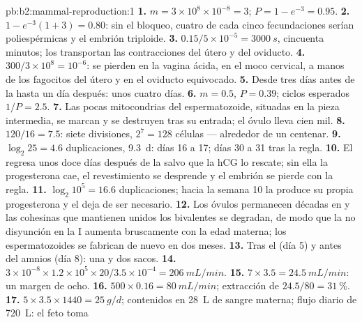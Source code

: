 \begin{solution}{pb:b2:mammal-reproduction:1}
\textbf{1.} $m = 3\times 10^{8}\times 10^{-8} = 3$; $P = 1 - e^{-3} =
0.95$.
\textbf{2.} $1 - e^{-3}(1 + 3) = 0.80$: sin el bloqueo, cuatro de cada
cinco fecundaciones serían poliespérmicas y el embrión triploide.
\textbf{3.} $0.15/5\times 10^{-5} = \qty{3000}{s}$, cincuenta minutos;
los transportan las contracciones del útero y del oviducto.
\textbf{4.} $300/3\times 10^{8} = 10^{-6}$: se pierden en la vagina
ácida, en el moco cervical, a manos de los fagocitos del útero y en el
oviducto equivocado.
\textbf{5.} Desde tres días antes de la  hasta un día después:
unos cuatro días.
\textbf{6.} $m = 0.5$, $P = 0.39$; ciclos esperados $1/P = 2.5$.
\textbf{7.} Las pocas mitocondrias del espermatozoide, situadas en la
pieza intermedia, se marcan y se destruyen tras su entrada; el óvulo
lleva cien mil.
\textbf{8.} $120/16 = 7.5$: siete divisiones, $2^{7} = 128$ células ---
alrededor de un centenar.
\textbf{9.} $\log_2 25 = 4.6$ duplicaciones, \qty{9.3}{d}: días 16 a 17;
días 30 a 31 tras la regla.
\textbf{10.} El  regresa unos doce días después de la
 salvo que la hCG lo rescate; sin ella la progesterona cae, el
revestimiento se desprende y el embrión se pierde con la regla.
\textbf{11.} $\log_2 10^{5} = 16.6$ duplicaciones; hacia la semana 10 la
 produce su propia progesterona y el  deja de ser
necesario.
\textbf{12.} Los óvulos permanecen décadas en  y las cohesinas
que mantienen unidos los bivalentes se degradan, de modo que la no
disyunción en la  I aumenta bruscamente con la edad materna; los
espermatozoides se fabrican de nuevo en dos meses.
\textbf{13.} Tras el  (día 5) y antes del amnios (día
8): una  y dos sacos.
\textbf{14.} $3\times 10^{-8}\times 1.2\times 10^{5}\times 20/3.5\times
10^{-4} = \qty{206}{mL/min}$.
\textbf{15.} $7\times 3.5 = \qty{24.5}{mL/min}$: un margen de ocho.
\textbf{16.} $500\times 0.16 = \qty{80}{mL/min}$; extracción de
$24.5/80 = \qty{31}{\%}$.
\textbf{17.} $5\times 3.5\times 1440 = \qty{25}{g/d}$; contenidos en
\qty{28}{L} de sangre materna; flujo diario de \qty{720}{L}: el feto toma

\end{solution}

